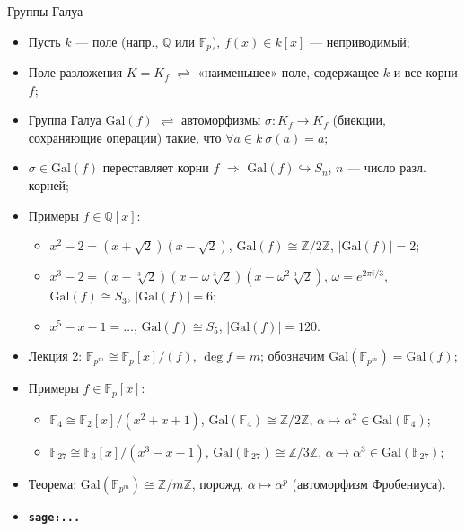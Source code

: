 \documentclass[serif, aspectratio=169]{beamer}
\newcommand{\sagemark}{%
  \textcolor{green!40!black}{\textbf{\texttt{sage:...}}}%
}
\begin{document}
\begin{frame}{Группы Галуа}
    \begin{itemize}
        \item Пусть $k$ --- поле (напр., $\mathbb{Q}$ или $\mathbb{F}_p$), $f(x)\in k[x]$ --- неприводимый; 
        \item Поле разложения $K=K_f$ $\rightleftharpoons$ «наименьшее» поле, содержащее $k$ и все корни $f$;
        \item Группа Галуа $\mathrm{Gal}(f)$ $\rightleftharpoons$ автоморфизмы $\sigma:K_f\to K_f$ (биекции, сохраняющие операции) такие, что $\forall a\in k\ \sigma(a)=a$;
        \item $\sigma\in \mathrm{Gal}(f)$ переставляет корни $f$ $\Rightarrow$ $\mathrm{Gal}(f)\hookrightarrow S_n$, $n$ --- число разл. корней;
        \item Примеры $f\in\mathbb{Q}[x]$:
        \begin{itemize}
            \item $x^2-2=(x+\sqrt2)(x-\sqrt2)$, $\mathrm{Gal}(f)\cong\mathbb{Z}/2\mathbb{Z}$, $|\mathrm{Gal}(f)|=2$;
            \item $x^3-2=(x-\sqrt[3]{2})(x-\omega\sqrt[3]{2})(x-\omega^2\sqrt[3]{2})$, $\omega=e^{2\pi i/3}$, $\mathrm{Gal}(f)\cong S_3$, $|\mathrm{Gal}(f)|=6$;
            \item $x^5-x-1=\dots$, $\mathrm{Gal}(f)\cong S_5$, $|\mathrm{Gal}(f)|=120$.
        \end{itemize}
        \item Лекция 2: $\mathbb{F}_{p^m}\cong\mathbb{F}_{p}[x]/(f)$, $\deg f=m$; обозначим $\mathrm{Gal}(\mathbb{F}_{p^m})=\mathrm{Gal}(f)$;
        \item Примеры $f\in\mathbb{F}_p[x]$:
        \begin{itemize}
            \item $\mathbb{F}_4\cong\mathbb{F}_2[x]/(x^2+x+1)$, $\mathrm{Gal}(\mathbb{F}_4)\cong\mathbb{Z}/2\mathbb{Z}$, $\alpha\mapsto\alpha^2\in\mathrm{Gal}(\mathbb{F}_4)$;
            \item $\mathbb{F}_{27}\cong\mathbb{F}_3[x]/(x^3-x-1)$, $\mathrm{Gal}(\mathbb{F}_{27})\cong\mathbb{Z}/3\mathbb{Z}$, $\alpha\mapsto\alpha^3\in \mathrm{Gal}(\mathbb{F}_{27})$;
        \end{itemize}
        \item Теорема: $\mathrm{Gal}(\mathbb{F}_{p^m})\cong\mathbb{Z}/m\mathbb{Z}$, порожд. $\alpha\mapsto\alpha^p$ (автоморфизм Фробениуса).
        \item \sagemark
    \end{itemize}

\end{frame}
\end{document}
